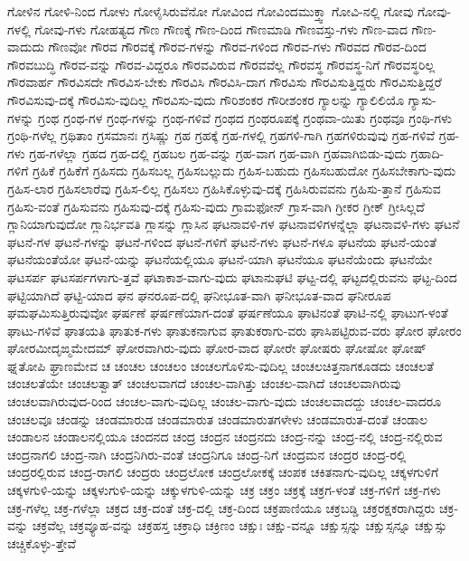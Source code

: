 {ಗೋಳಿನ
ಗೋಳಿ-ನಿಂದ
ಗೋಳು
ಗೋಳೈಸಿರುವೆನೋ
ಗೋವಿಂದ
ಗೋವಿಂದಮುಕ್ತ್ವಾ
ಗೋವಿ-ನಲ್ಲಿ
ಗೋವು
ಗೋವು-ಗಳಲ್ಲಿ
ಗೋವು-ಗಳು
ಗೋಹತ್ಯದ
ಗೌಣ
ಗೌಣಕ್ಕೆ
ಗೌಣ-ದಿಂದ
ಗೌಣಮಾಡಿ
ಗೌಣವಸ್ತು-ಗಳು
ಗೌಣ-ವಾದ
ಗೌಣ-ವಾದುದು
ಗೌಣವೋ
ಗೌರವ
ಗೌರವಕ್ಕೆ
ಗೌರವ-ಗಳನ್ನು
ಗೌರವ-ಗಳಿಂದ
ಗೌರವ-ಗಳು
ಗೌರವದ
ಗೌರವ-ದಿಂದ
ಗೌರವಬುದ್ಧಿ
ಗೌರವ-ವನ್ನು
ಗೌರವ-ವಿದ್ದರೂ
ಗೌರವವಿರುವ
ಗೌರವವೆಲ್ಲ
ಗೌರವಸ್ಥ
ಗೌರವಸ್ಥ-ನಿಗೆ
ಗೌರವಸ್ಥರಿಲ್ಲ
ಗೌರವಾರ್ಹ
ಗೌರವಿಸದೇ
ಗೌರವಿಸ-ಬೇಕು
ಗೌರವಿಸಿ
ಗೌರವಿಸಿ-ದಾಗ
ಗೌರವಿಸು
ಗೌರವಿಸುತ್ತಿದ್ದರು
ಗೌರವಿಸುತ್ತಿದ್ದರೆ
ಗೌರವಿಸುವು-ದಕ್ಕೆ
ಗೌರವಿಸು-ವುದಿಲ್ಲ
ಗೌರವಿಸು-ವುದು
ಗೌರಿಶಂಕರ
ಗೌರೀಶಂಕರ
ಗ್ಯಾಲನ್ನು
ಗ್ಯಾಲಿಲಿಯೊ
ಗ್ಯಾಸು-ಗಳನ್ನು
ಗ್ರಂಥ
ಗ್ರಂಥ-ಗಳ
ಗ್ರಂಥ-ಗಳನ್ನು
ಗ್ರಂಥ-ಗಳಿವೆ
ಗ್ರಂಥದ
ಗ್ರಂಥರೂಪಕ್ಕೆ
ಗ್ರಂಥವಾ-ಯಿತು
ಗ್ರಂಥವೂ
ಗ್ರಂಥಿ-ಗಳು
ಗ್ರಂಥಿ-ಗಳೆಲ್ಲ
ಗ್ರಥಿತಾಂ
ಗ್ರಸಮಾನಃ
ಗ್ರಸಿಷ್ಣು
ಗ್ರಹ
ಗ್ರಹಕ್ಕೆ
ಗ್ರಹ-ಗಳಲ್ಲಿ
ಗ್ರಹಗಳಿ-ಗಾಗಿ
ಗ್ರಹಗಳಿರುವುವು
ಗ್ರಹ-ಗಳಿವೆ
ಗ್ರಹ-ಗಳು
ಗ್ರಹ-ಗಳೆಲ್ಲಾ
ಗ್ರಹದ
ಗ್ರಹ-ದಲ್ಲಿ
ಗ್ರಹಬಲ
ಗ್ರಹ-ವನ್ನು
ಗ್ರಹ-ವಾಗ
ಗ್ರಹ-ವಾಗಿ
ಗ್ರಹವಾಗಿಬಿಡು-ವುದು
ಗ್ರಹಾದಿ-ಗಳಿಗೆ
ಗ್ರಹಿಕೆ
ಗ್ರಹಿಕೆಗೆ
ಗ್ರಹಿಸದು
ಗ್ರಹಿಸಬಲ್ಲ
ಗ್ರಹಿಸಬಲ್ಲುದು
ಗ್ರಹಿಸ-ಬಹುದು
ಗ್ರಹಿಸಬಹುದೋ
ಗ್ರಹಿಸಬೇಕಾಗು-ವುದು
ಗ್ರಹಿಸ-ಲಾರ
ಗ್ರಹಿಸಲಾರೆವು
ಗ್ರಹಿಸ-ಲಿಲ್ಲ
ಗ್ರಹಿಸಲು
ಗ್ರಹಿಸಿಕೊಳ್ಳುವು-ದಕ್ಕೆ
ಗ್ರಹಿಸಿರುವವನು
ಗ್ರಹಿಸು-ತ್ತಾನೆ
ಗ್ರಹಿಸುವ
ಗ್ರಹಿಸು-ವಂತೆ
ಗ್ರಹಿಸುವನು
ಗ್ರಹಿಸುವು-ದಕ್ಕೆ
ಗ್ರಹಿಸು-ವುದು
ಗ್ರಾಮಫೋನ್
ಗ್ರಾಸ-ವಾಗಿ
ಗ್ರೀಕರ
ಗ್ರೀಕ್
ಗ್ರೀಸಿಲ್ಲದೆ
ಗ್ಲಾನಿಯಾಗುವುದೋ
ಗ್ಲಾನಿರ್ಭವತಿ
ಗ್ಲಾಸನ್ನು
ಗ್ಲಾಸಿನ
ಘಟನಾವಳಿ-ಗಳ
ಘಟನಾವಳಿಗಳನ್ನೆಲ್ಲಾ
ಘಟನಾವಳಿ-ಗಳು
ಘಟನೆ
ಘಟನೆ-ಗಳ
ಘಟನೆ-ಗಳನ್ನು
ಘಟನೆ-ಗಳಿಂದ
ಘಟನೆ-ಗಳಿಗೆ
ಘಟನೆ-ಗಳು
ಘಟನೆ-ಗಳೂ
ಘಟನೆಯ
ಘಟನೆ-ಯಂತೆ
ಘಟನೆಯಂತೆಯೋ
ಘಟನೆ-ಯನ್ನು
ಘಟನೆಯಲ್ಲಿಯೂ
ಘಟನೆ-ಯಾಗಿ
ಘಟನೆಯೂ
ಘಟನೆಯೆಂದು
ಘಟನೆಯೇ
ಘಟಸರ್ಪ
ಘಟಸರ್ಪಗಳಾಗು-ತ್ತವೆ
ಘಟಾಕಾಶ-ವಾಗು-ವುದು
ಘಟಾನುಘಟಿ
ಘಟ್ಟ-ದಲ್ಲಿ
ಘಟ್ಟದಲ್ಲಿರುವನು
ಘಟ್ಟ-ದಿಂದ
ಘಟ್ಟಿಯಾಗಿದೆ
ಘಟ್ಟಿ-ಯಾದ
ಘನ
ಘನರೂಪ-ದಲ್ಲಿ
ಘನೀಭೂತ-ವಾಗಿ
ಘನೀಭೂತ-ವಾದ
ಘನೀರೂಪ
ಘಮಘಮಿಸುತ್ತಿರುವುವೋ
ಘರ್ಷಣೆ
ಘರ್ಷಣೆಯಾಗ-ದಂತೆ
ಘರ್ಷಣೆಯೂ
ಘಾಟಿನಂತೆ
ಘಾಟಿ-ನಲ್ಲಿ
ಘಾಟುಗ-ಳಂತೆ
ಘಾಟು-ಗಳಿವೆ
ಘಾತಯತಿ
ಘಾತುಕ-ಗಳು
ಘಾತುಕನಾಗುವ
ಘಾತುಕರಾಗು-ವರು
ಘಾಸಿಪಟ್ಟಿರುವ-ವರು
ಘೋರ
ಘೋರಂ
ಘೋರಮೀದೃಙ್ಮಮೇದಮ್
ಘೋರವಾಗಿರು-ವುದು
ಘೋರ-ವಾದ
ಘೋರೇ
ಘೋಷರು
ಘೋಷೋ
ಘೋಷ್
ಘ್ನತೋಪಿ
ಘ್ರಾಣಮೇವ
ಚ
ಚಂಚಲ
ಚಂಚಲಂ
ಚಂಚಲಗೊಳಿಸು-ವುದಿಲ್ಲ
ಚಂಚಲಚಿತ್ತನಾಗಕೂಡದು
ಚಂಚಲತೆ
ಚಂಚಲತೆಯೇ
ಚಂಚಲತ್ವಾತ್
ಚಂಚಲವಾಗದೆ
ಚಂಚಲ-ವಾಗಿತ್ತು
ಚಂಚಲ-ವಾಗಿದೆ
ಚಂಚಲವಾಗಿರುವು
ಚಂಚಲವಾಗಿರುವುದ-ರಿಂದ
ಚಂಚಲ-ವಾಗು-ವುದಿಲ್ಲ
ಚಂಚಲ-ವಾಗು-ವುದು
ಚಂಚಲವಾದದ್ದು
ಚಂಚಲ-ವಾದರೂ
ಚಂಚಲವೂ
ಚಂಡನ್ನು
ಚಂಡಮಾರುಡ
ಚಂಡಮಾರುತ
ಚಂಡಮಾರುತಗಳೇಳು
ಚಂಡಮಾರುತ-ದಂತೆ
ಚಂಡಾಲ
ಚಂಡಾಲನ
ಚಂಡಾಲನಲ್ಲಿಯೂ
ಚಂದನದ
ಚಂದ್ರ
ಚಂದ್ರನ
ಚಂದ್ರನದು
ಚಂದ್ರ-ನನ್ನು
ಚಂದ್ರ-ನಲ್ಲಿ
ಚಂದ್ರ-ನಲ್ಲಿರುವ
ಚಂದ್ರನಾಗಲಿ
ಚಂದ್ರ-ನಾಗಿ
ಚಂದ್ರನಿಗಿರು-ವಂತೆ
ಚಂದ್ರನಿಗೂ
ಚಂದ್ರ-ನಿಗೆ
ಚಂದ್ರಮನ
ಚಂದ್ರರ
ಚಂದ್ರ-ರಲ್ಲಿ
ಚಂದ್ರರಲ್ಲಿರುವ
ಚಂದ್ರ-ರಾಗಲಿ
ಚಂದ್ರರು
ಚಂದ್ರಲೋಕ
ಚಂದ್ರಲೋಕಕ್ಕೆ
ಚಂಪಕ
ಚಕಿತನಾಗು-ವುದಿಲ್ಲ
ಚಕ್ಕಳಗುಳಿಗೆ
ಚಕ್ಕಳಗುಳಿ-ಯನ್ನು
ಚಕ್ಕಳುಗುಳಿ-ಯನ್ನು
ಚಕ್ಕುಳಗುಳಿ-ಯನ್ನು
ಚಕ್ರ
ಚಕ್ರಂ
ಚಕ್ರಕ್ಕೆ
ಚಕ್ರಗ-ಳಂತೆ
ಚಕ್ರ-ಗಳಿಗೆ
ಚಕ್ರ-ಗಳು
ಚಕ್ರ-ಗಳೆಲ್ಲ
ಚಕ್ರ-ಗಳೆಲ್ಲಾ
ಚಕ್ರದ
ಚಕ್ರ-ದಂತೆ
ಚಕ್ರ-ದಲ್ಲಿ
ಚಕ್ರ-ದಿಂದ
ಚಕ್ರಪಾಣಿಯೂ
ಚಕ್ರಬಡ್ಡಿ
ಚಕ್ರರಕ್ಷಕರಾಗಿದ್ದರು
ಚಕ್ರ-ವನ್ನು
ಚಕ್ರವೆಲ್ಲ
ಚಕ್ರವ್ಯೂಹ-ವನ್ನು
ಚಕ್ರಹಸ್ತ
ಚಕ್ರಾಧಿ
ಚಕ್ರಿಣಂ
ಚಕ್ಷುಃ
ಚಕ್ಷು-ವನ್ನೂ
ಚಕ್ಷುಸ್ಸನ್ನು
ಚಕ್ಷುಸ್ಸನ್ನೂ
ಚಕ್ಷುಸ್ಸು
ಚಚ್ಚಿಕೊಳ್ಳು-ತ್ತೇವೆ
}
